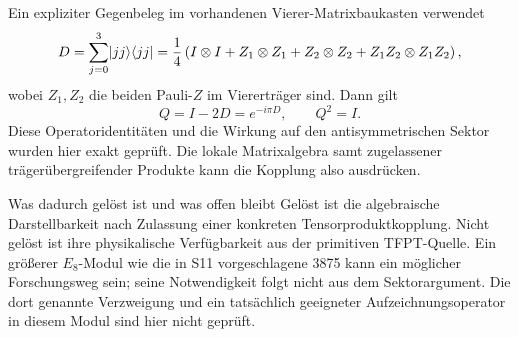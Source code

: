 Ein expliziter Gegenbeleg im vorhandenen Vierer-Matrixbaukasten verwendet
\begin{equation}
D=\sum_{j=0}^3\lvert jj\rangle\langle jj\rvert
=\frac14\left(I\otimes I+Z_1\otimes Z_1+Z_2\otimes Z_2
+Z_1Z_2\otimes Z_1Z_2\right),
\end{equation}
wobei $Z_1,Z_2$ die beiden Pauli-$Z$ im Viererträger sind. Dann gilt
\begin{equation}
Q=I-2D=e^{-i\pi D},\qquad Q^2=I.
\end{equation}
Diese Operatoridentitäten und die Wirkung auf den antisymmetrischen Sektor wurden hier exakt geprüft. Die lokale Matrixalgebra samt zugelassener trägerübergreifender Produkte kann die Kopplung also ausdrücken.

\begin{grenze}{Was dadurch gelöst ist und was offen bleibt}
Gelöst ist die algebraische Darstellbarkeit nach Zulassung einer konkreten Tensorproduktkopplung. Nicht gelöst ist ihre physikalische Verfügbarkeit aus der primitiven TFPT-Quelle. Ein größerer $E_8$-Modul wie die in S11 vorgeschlagene 3875 kann ein möglicher Forschungsweg sein; seine Notwendigkeit folgt nicht aus dem Sektorargument. Die dort genannte Verzweigung und ein tatsächlich geeigneter Aufzeichnungsoperator in diesem Modul sind hier nicht geprüft.
\end{grenze}
